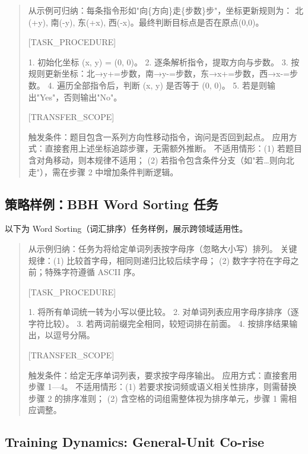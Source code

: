 \documentclass[11pt]{article}
\begin{document}
\begin{quote}\small{}

从示例可归纳：每条指令形如"向\{方向\}走\{步数\}步"，坐标更新规则为：
北(+y), 南(-y), 东(+x), 西(-x)。最终判断目标点是否在原点(0,0)。

[TASK\_PROCEDURE]

1. 初始化坐标 (x, y) = (0, 0)。
2. 逐条解析指令，提取方向与步数。
3. 按规则更新坐标：北→y+=步数，南→y-=步数，东→x+=步数，西→x-=步数。
4. 遍历全部指令后，判断 (x, y) 是否等于 (0, 0)。
5. 若是则输出"Yes"，否则输出"No"。

[TRANSFER\_SCOPE]

触发条件：题目包含一系列方向性移动指令，询问是否回到起点。
应用方式：直接套用上述坐标追踪步骤，无需额外推断。
不适用情形：(1) 若题目含对角移动，则本规律不适用；
            (2) 若指令包含条件分支（如"若…则向北走"），需在步骤 2 中增加条件判断逻辑。
\end{quote}

\subsection{策略样例：BBH Word Sorting 任务}

以下为 Word Sorting（词汇排序）任务样例，展示跨领域适用性。

\begin{quote}\small{}

从示例归纳：任务为将给定单词列表按字母序（忽略大小写）排列。
关键规律：(1) 比较首字母，相同则递归比较后续字母；
(2) 数字字符在字母之前；特殊字符遵循 ASCII 序。

[TASK\_PROCEDURE]

1. 将所有单词统一转为小写以便比较。
2. 对单词列表应用字母序排序（逐字符比较）。
3. 若两词前缀完全相同，较短词排在前面。
4. 按排序结果输出，以逗号分隔。

[TRANSFER\_SCOPE]

触发条件：给定无序单词列表，要求按字母序输出。
应用方式：直接套用步骤 1—4。
不适用情形：(1) 若要求按词频或语义相关性排序，则需替换步骤 2 的排序准则；
            (2) 含空格的词组需整体视为排序单元，步骤 1 需相应调整。
\end{quote}

\subsection{Training Dynamics: General-Unit Co-rise}
\label{app:strategy_evolution}
\end{document}
